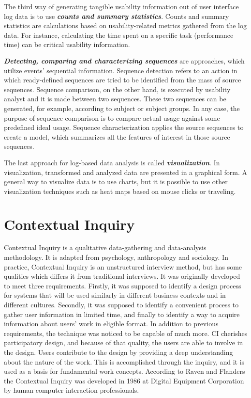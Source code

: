 \documentclass[12pt,a4paper,oneside,pdftex]{report}
\begin{document}
The third way of generating tangible usability information out of user interface log data is to use \textbf{\emph{counts and summary statistics}}. Counts and summary statistics are calculations based on usability-related metrics gathered from the log data. For instance, calculating the time spent on a specific task (performance time) can be critical usability information. \citep{RefWorks:24, RefWorks:25}

\textbf{\emph{Detecting, comparing and characterizing sequences}} are approaches, which utilize events' sequential information. Sequence detection refers to an action in which ready-defined sequences are tried to be identified from the mass of source sequences. Sequence comparison, on the other hand, is  executed by usability analyst and it is made between two sequences. These two sequences can be generated, for example, according to subject or subject groups. In any case, the purpose of sequence comparison is to compare actual usage against some predefined ideal usage. Sequence characterization applies the source sequences to create a model, which summarizes all the features of interest in those source sequences. \citep{RefWorks:24, RefWorks:25}
 
The last approach for log-based data analysis is called \textbf{\emph{visualization}}. In visualization, transformed and analyzed data are  presented in a graphical form. A general way to visualize data is to use charts, but it is possible to use other visualization techniques such as heat maps based on mouse clicks or traveling. \citep{RefWorks:24, RefWorks:25}

\section{Contextual Inquiry}
\label{sec:cinquiry}
Contextual Inquiry is a qualitative data-gathering and data-analysis methodology. It is adapted from psychology, anthropology and sociology. \citep{RefWorks:28} In practice, Contextual Inquiry is an unstructured interview method, but has some qualities which differs it from traditional interviews.\citep{RefWorks:23}  It was originally developed to meet three requirements. Firstly, it was supposed to identify a design process for systems that will be used similarly in different business contexts and in different cultures. Secondly, it was supposed to identify a convenient process to gather user information in limited time, and finally to identify a way to acquire information about users' work in eligible format. In addition to previous requirements, the technique was noticed to be capable of much more. CI cherishes participatory design, and because of that quality, the users are able to involve in the design. Users contribute to the design by providing a deep understanding about the nature of the work. This is accomplished through the inquiry, and it is used as a basis for fundamental work concepts. \citep{RefWorks:14} According to Raven and Flanders \citep{RefWorks:28} the Contextual Inquiry was developed in 1986 at Digital Equipment Corporation by human-computer interaction professionals. \citep{RefWorks:28} 
\end{document}
